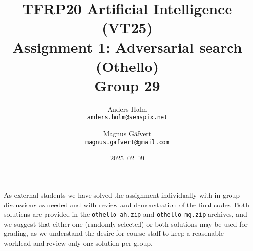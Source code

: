 \documentclass[a4paper]{article}
\title{TFRP20 Artificial Intelligence (VT25)\\ Assignment 1: Adversarial search (Othello)\\Group 29 }
\author{Anders Holm\\\texttt{anders.holm@senspix.net} \and
Magnus Gäfvert\\\texttt{magnus.gafvert@gmail.com}}
\date{2025--02--09}
\begin{document}
\maketitle
As external students we have solved the assignment individually with in-group discussions as needed and with review and demonstration of the final codes. Both solutions are provided in the \texttt{othello-ah.zip} and \texttt{othello-mg.zip} archives, and we suggest that either one (randomly selected) or both solutions may be used for grading, as we understand the desire for course staff to keep a reasonable workload and review only one solution per group.
\end{document}
